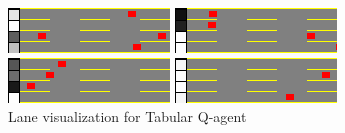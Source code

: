 \begin{figure}[H]
    \centering
    \begin{minipage}[t]{0.48\textwidth}
        \centering
        \includegraphics[width=\linewidth]{plots/part1-a-lane_visualization_00_step_0240.png}
    \end{minipage}
    \hfill
    \begin{minipage}[t]{0.48\textwidth}
        \centering
        \includegraphics[width=\linewidth]{plots/part1-a-lane_visualization_00_step_0260.png}
    \end{minipage}
    
    \vspace{2mm}
    
    \begin{minipage}[t]{0.48\textwidth}
        \centering
        \includegraphics[width=\linewidth]{plots/part1-a-lane_visualization_01_step_0340.png}
    \end{minipage}
    \hfill
    \begin{minipage}[t]{0.48\textwidth}
        \centering
        \includegraphics[width=\linewidth]{plots/part1-a-lane_visualization_01_step_0600.png}
    \end{minipage}
    \caption{Lane visualization for Tabular Q-agent}
    \label{fig:part1-a-lane-visualization}
\end{figure}

